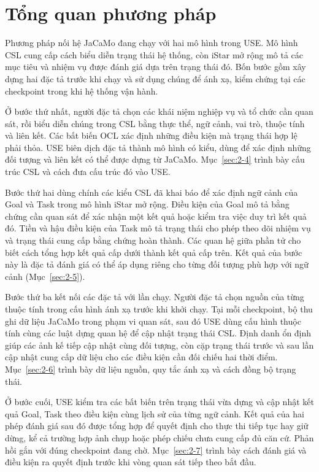 \documentclass[12pt,a4paper,oneside]{extreport}
\begin{document}
\section{Tổng quan phương pháp}\label{sec:2-3}

Phương pháp nối hệ JaCaMo đang chạy với hai mô hình trong USE. Mô hình CSL cung cấp cách biểu diễn trạng thái hệ thống, còn iStar mở rộng mô tả các mục tiêu và nhiệm vụ được đánh giá dựa trên trạng thái đó. Bốn bước gồm xây dựng hai đặc tả trước khi chạy và sử dụng chúng để ánh xạ, kiểm chứng tại các checkpoint trong khi hệ thống vận hành.

Ở bước thứ nhất, người đặc tả chọn các khái niệm nghiệp vụ và tổ chức cần quan sát, rồi biểu diễn chúng trong CSL bằng thực thể, ngữ cảnh, vai trò, thuộc tính và liên kết. Các bất biến OCL xác định những điều kiện mà trạng thái hợp lệ phải thỏa. USE biên dịch đặc tả thành mô hình có kiểu, dùng để xác định những đối tượng và liên kết có thể được dựng từ JaCaMo. Mục~\ref{sec:2-4} trình bày cấu trúc CSL và cách đưa cấu trúc đó vào USE.

Bước thứ hai dùng chính các kiểu CSL đã khai báo để xác định ngữ cảnh của Goal và Task trong mô hình iStar mở rộng. Điều kiện của Goal mô tả bằng chứng cần quan sát để xác nhận một kết quả hoặc kiểm tra việc duy trì kết quả đó. Tiền và hậu điều kiện của Task mô tả trạng thái cho phép theo dõi nhiệm vụ và trạng thái cung cấp bằng chứng hoàn thành. Các quan hệ giữa phần tử cho biết cách tổng hợp kết quả cấp dưới thành kết quả cấp trên. Kết quả của bước này là đặc tả đánh giá có thể áp dụng riêng cho từng đối tượng phù hợp với ngữ cảnh (Mục~\ref{sec:2-5}).

Bước thứ ba kết nối các đặc tả với lần chạy. Người đặc tả chọn nguồn của từng thuộc tính trong cấu hình ánh xạ trước khi khởi chạy. Tại mỗi checkpoint, bộ thu ghi dữ liệu JaCaMo trong phạm vi quan sát, sau đó USE dùng cấu hình thuộc tính cùng các luật dựng quan hệ để cập nhật trạng thái CSL. Định danh ổn định giúp các ảnh kế tiếp cập nhật cùng đối tượng, còn cặp trạng thái trước và sau lần cập nhật cung cấp dữ liệu cho các điều kiện cần đối chiếu hai thời điểm. Mục~\ref{sec:2-6} trình bày dữ liệu nguồn, quy tắc ánh xạ và cách đồng bộ trạng thái.

Ở bước cuối, USE kiểm tra các bất biến trên trạng thái vừa dựng và cập nhật kết quả Goal, Task theo điều kiện cùng lịch sử của từng ngữ cảnh. Kết quả của hai phép đánh giá sau đó được tổng hợp để quyết định cho thực thi tiếp tục hay giữ dừng, kể cả trường hợp ảnh chụp hoặc phép chiếu chưa cung cấp đủ căn cứ. Phản hồi gắn với đúng checkpoint đang chờ. Mục~\ref{sec:2-7} trình bày cách đánh giá và điều kiện ra quyết định trước khi vòng quan sát tiếp theo bắt đầu.
\end{document}
